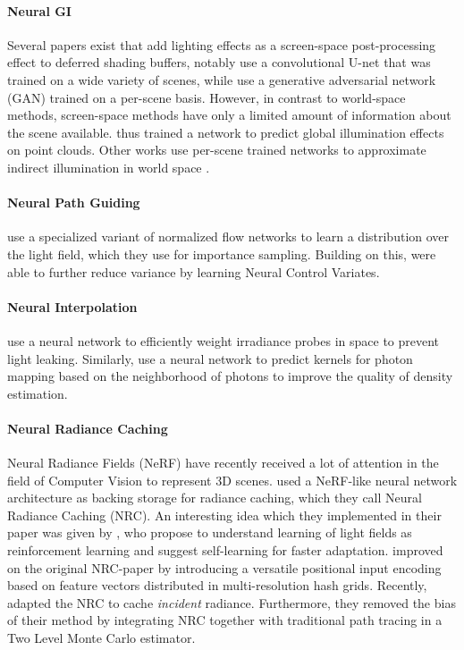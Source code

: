 \paragraph{Neural GI}
Several papers exist that add lighting effects as a screen-space post-processing effect to deferred shading buffers, notably \textcite{nalbach2017} use a convolutional U-net that was trained on a wide variety of scenes, while \textcite{thomas2018} use a generative adversarial network (GAN) trained on a per-scene basis.
However, in contrast to world-space methods, screen-space methods have only a limited amount of information about the scene available.
\textcite{hermosilla2019} thus trained a network to predict global illumination effects on point clouds.
Other works use per-scene trained networks to approximate indirect illumination in world space \parencite{ren2013}.

\paragraph{Neural Path Guiding}
\textcite{muller2019} use a specialized variant of normalized flow networks to learn a distribution over the light field, which they use for importance sampling.
Building on this, \textcite{muller2020} were able to further reduce variance by learning Neural Control Variates.

\paragraph{Neural Interpolation}
\textcite{iwanicki2017} use a neural network to efficiently weight irradiance probes in space to prevent light leaking.
Similarly, \textcite{zhu2020} use a neural network to predict kernels for photon mapping based on the neighborhood of photons to improve the quality of density estimation.

\paragraph{Neural Radiance Caching}
Neural Radiance Fields (NeRF) \parencite{mildenhall2020} have recently received a lot of attention in the field of Computer Vision to represent 3D scenes.
\textcite{muller2021} used a NeRF-like neural network architecture as backing storage for radiance caching, which they call Neural Radiance Caching (NRC).
An interesting idea which they implemented in their paper was given by \textcite{dahm2017}, who propose to understand learning of light fields as reinforcement learning and suggest self-learning for faster adaptation.
\textcite{muller2022} improved on the original NRC-paper by introducing a versatile positional input encoding based on feature vectors distributed in multi-resolution hash grids.
Recently, \textcite{dereviannykh2024} adapted the NRC to cache \emph{incident} radiance.
Furthermore, they removed the bias of their method by integrating NRC together with traditional path tracing in a Two Level Monte Carlo estimator.

